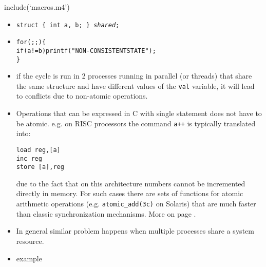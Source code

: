 include(`macros.m4')

\pagebreak
{}

\begin{slide}
\end{slide}



\begin{slide}
\begin{itemize}
\item \texttt{struct \{ int a, b; \} \emph{shared};}
\item
\begin{alltt}
for( ; ; ) \{
    if (a != b) printf("NON-CONSISTENT STATE");
\} 
\end{alltt}
\item if the cycle is run in 2 processes running in parallel (or threads)
that share the same structure and have different values of the
\texttt{val} variable, it will lead to conflicts due to non-atomic operations.
\end{itemize}
\end{slide}

\label{SYNCHRONIZATION}

\begin{itemize}
\item Operations that can be expressed in C with single statement does not
have to be atomic. e.g. on RISC processors the command \verb.a++.
is typically translated into:

\begin{verbatim}
load reg,[a]
inc reg
store [a],reg
\end{verbatim}

due to the fact that on this architecture numbers cannot be incremented
directly in memory. For such cases there are sets of functions for atomic
arithmetic operations (e.g. \texttt{atomic\_add(3c)} on Solaris) that are
much faster than classic synchronization mechanisms.
More on page \pageref{ATOMIC_ADD}.
\item In general similar problem happens when multiple processes share a 
system resource.
\item \label{RACE_C} example 
\end{itemize}

